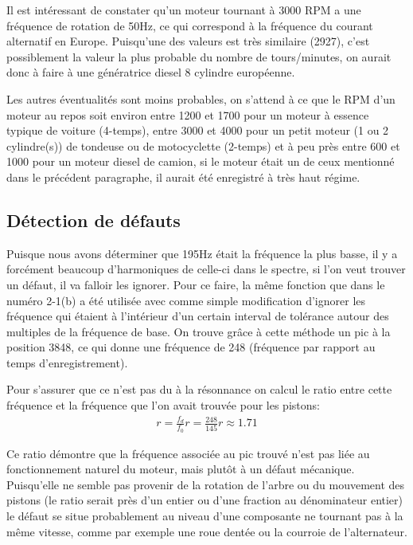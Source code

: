 \documentclass[11pt]{article}
\begin{document}
Il est intéressant de constater qu'un moteur tournant à 3000 RPM a une fréquence de rotation de 50Hz, ce qui correspond à la fréquence du courant alternatif en Europe. Puisqu'une des valeurs est très similaire (2927), c'est possiblement la valeur la plus probable du nombre de tours/minutes, on aurait donc à faire à une génératrice diesel 8 cylindre européenne.

Les autres éventualités sont moins probables, on s'attend à ce que le RPM d'un moteur au repos soit environ entre 1200 et 1700 pour un moteur à essence typique de voiture (4-temps), entre 3000 et 4000 pour un petit moteur (1 ou 2 cylindre(s)) de tondeuse ou de motocyclette (2-temps) et à peu près entre 600 et 1000 pour un moteur diesel de camion, si le moteur était un de ceux mentionné dans le précédent paragraphe, il aurait été enregistré à très haut régime.

\subsection{Détection de défauts}
Puisque nous avons déterminer que 195Hz était la fréquence la plus basse, il y a forcément beaucoup d'harmoniques de celle-ci dans le spectre, si l'on veut trouver un défaut, il va falloir les ignorer. Pour ce faire, la même fonction que dans le numéro 2-1(b) a été utilisée avec comme simple modification d'ignorer les fréquence qui étaient à l'intérieur d'un certain interval de tolérance autour des multiples de la fréquence de base. On trouve grâce à cette méthode un pic à la position 3848, ce qui donne une fréquence de 248 (fréquence par rapport au temps d'enregistrement).

\pagebreak
Pour s'assurer que ce n'est pas du à la résonnance on calcul le ratio entre cette fréquence et la fréquence que l'on avait trouvée pour les pistons:
\begin{gather*}
  r = \frac{f_d }{f_0}
  r = \frac{248}{145}
  r \approx 1.71
\end{gather*}

Ce ratio démontre que la fréquence associée au pic trouvé n'est pas liée au fonctionnement naturel du moteur, mais plutôt à un défaut mécanique. Puisqu'elle ne semble pas provenir de la rotation de l'arbre ou du mouvement des pistons (le ratio serait près d'un entier ou d'une fraction au dénominateur entier) le défaut se situe probablement au niveau d'une composante ne tournant pas à la même vitesse, comme par exemple une roue dentée ou la courroie de l'alternateur.
\end{document}
